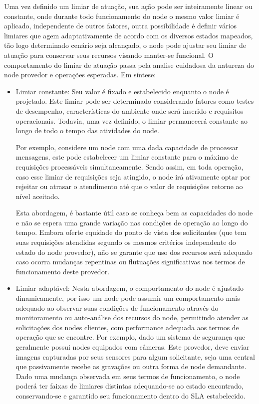 Uma vez definido um limiar de atuação, sua ação pode ser inteiramente linear ou constante, onde durante todo funcionamento do node o mesmo valor limiar é aplicado, independente de outros fatores, outra possibilidade é definir vários limiares que agem adaptativamente de acordo com os diversos estados mapeados, tão logo determinado cenário seja alcançado, o node pode ajustar seu limiar de atuação para conservar seus recursos visando manter-se funcional. O comportamento do limiar de atuação passa pela analise cuidadosa da natureza do node provedor e operações esperadas. Em síntese:

\begin{itemize}
    \item Limiar constante: Seu valor é fixado e estabelecido enquanto o node é projetado. Este limiar pode ser determinado considerando fatores como testes de desempenho, características do ambiente onde será inserido e requisitos operacionais. Todavia, uma vez definido, o limiar permanecerá constante ao longo de todo o tempo das atividades do node. 
    
    Por exemplo, considere um node com uma dada capacidade de processar mensagens, este pode estabelecer um limiar constante para o máximo de requisições processáveis simultaneamente. Sendo assim, em toda operação, caso esse limiar de requisições seja atingido, o node irá ativamente optar por rejeitar ou atrasar o atendimento até que o valor de requisições retorne ao nível aceitado. 
    
    Esta abordagem, é bastante útil caso se conheça bem as capacidades do node e não se espera uma grande variação nas condições de operação ao longo do tempo. Embora oferte equidade do ponto de vista dos solicitantes (que tem suas requisições atendidas segundo os mesmos critérios independente do estado do node provedor), não se garante que uso dos recursos será adequado caso ocorra mudanças repentinas ou flutuações significativas nos termos de funcionamento deste provedor.
    
    \item Limiar adaptável: Nesta abordagem, o comportamento do node é ajustado dinamicamente, por isso um node pode assumir um comportamento mais adequado ao observar suas condições de funcionamento através do monitoramento ou auto-análise dos recursos do node, permitindo atender as solicitações dos nodes clientes, com performance adequada aos termos de operação que se encontre. Por exemplo, dado um sistema de segurança que geralmente possui nodes equipados com câmeras. Este provedor, deve enviar imagens capturadas por seus sensores para algum solicitante, seja uma central que passivamente recebe as gravações ou outra forma de node demandante. Dado uma mudança observada em seus termos de funcionamento, o node poderá ter faixas de limiares distintas adequando-se ao estado encontrado, conservando-se e garantido seu funcionamento dentro do \acs{SLA} estabelecido.   
    

\end{itemize}
